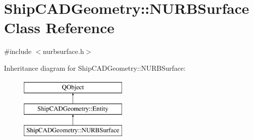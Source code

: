 \hypertarget{classShipCADGeometry_1_1NURBSurface}{\section{Ship\-C\-A\-D\-Geometry\-:\-:N\-U\-R\-B\-Surface Class Reference}
\label{classShipCADGeometry_1_1NURBSurface}
}


{\ttfamily \#include $<$nurbsurface.\-h$>$}

Inheritance diagram for Ship\-C\-A\-D\-Geometry\-:\-:N\-U\-R\-B\-Surface\-:\begin{figure}[H]
\begin{center}
\leavevmode
\includegraphics[height=3.000000cm]{classShipCADGeometry_1_1NURBSurface}
\end{center}
\end{figure}
